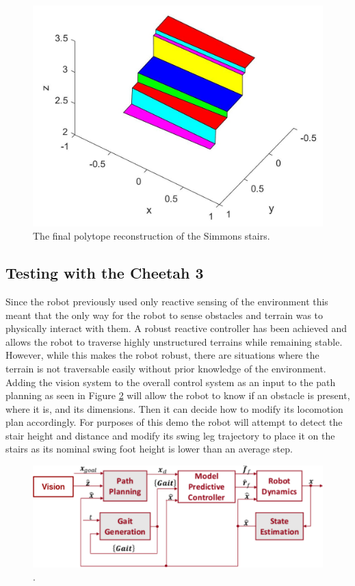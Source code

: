 \begin{figure}[!h]
\centering
\includegraphics[width=\columnwidth]{Sections/Figures/simmons-stairs-diagonal-geom.jpg}
\caption{The final polytope reconstruction of the Simmons stairs. }
\label{simmons-polytope}
\end{figure}

\subsection{Testing with the Cheetah 3}

Since the robot previously used only reactive sensing of the environment this meant that the only way for the robot to sense obstacles and terrain was to physically interact with them. A robust reactive controller has been achieved and allows the robot to traverse highly unstructured terrains while remaining stable. However, while this makes the robot robust, there are situations where the terrain is not traversable easily without prior knowledge of the environment. Adding the vision system to the overall control system as an input to the path planning as seen in Figure \ref{fig:BD} will allow the robot to know if an obstacle is present, where it is, and its dimensions. Then it can decide how to modify its locomotion plan accordingly. For purposes of this demo the robot will attempt to detect the stair height and distance and modify its swing leg trajectory to place it on the stairs as its nominal swing foot height is lower than an average step.
\begin{figure}[!h]
\centering
\includegraphics[width=\columnwidth]{Figures/BlockDiagram.pdf}
\caption{.}
\label{fig:BD}
\end{figure}

